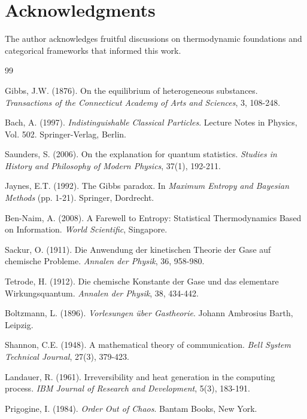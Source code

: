 \documentclass[12pt,a4paper]{article}
\theoremstyle{remark}
\begin{document}
\section*{Acknowledgments}

The author acknowledges fruitful discussions on thermodynamic foundations and categorical frameworks that informed this work.


\begin{thebibliography}{99}

Gibbs, J.W. (1876). On the equilibrium of heterogeneous substances. \textit{Transactions of the Connecticut Academy of Arts and Sciences}, 3, 108-248.

Bach, A. (1997). \textit{Indistinguishable Classical Particles}. Lecture Notes in Physics, Vol. 502. Springer-Verlag, Berlin.

Saunders, S. (2006). On the explanation for quantum statistics. \textit{Studies in History and Philosophy of Modern Physics}, 37(1), 192-211.

Jaynes, E.T. (1992). The Gibbs paradox. In \textit{Maximum Entropy and Bayesian Methods} (pp. 1-21). Springer, Dordrecht.

Ben-Naim, A. (2008). A Farewell to Entropy: Statistical Thermodynamics Based on Information. \textit{World Scientific}, Singapore.

Sackur, O. (1911). Die Anwendung der kinetischen Theorie der Gase auf chemische Probleme. \textit{Annalen der Physik}, 36, 958-980.

Tetrode, H. (1912). Die chemische Konstante der Gase und das elementare Wirkungsquantum. \textit{Annalen der Physik}, 38, 434-442.

Boltzmann, L. (1896). \textit{Vorlesungen über Gastheorie}. Johann Ambrosius Barth, Leipzig.

Shannon, C.E. (1948). A mathematical theory of communication. \textit{Bell System Technical Journal}, 27(3), 379-423.

Landauer, R. (1961). Irreversibility and heat generation in the computing process. \textit{IBM Journal of Research and Development}, 5(3), 183-191.

Prigogine, I. (1984). \textit{Order Out of Chaos}. Bantam Books, New York.


\end{thebibliography}
\end{document}
